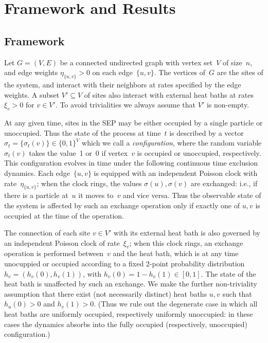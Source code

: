 \documentclass[11pt]{article}
\theoremstyle{plain}
\theoremstyle{definition}
\theoremstyle{remark}
\numberwithin{equation}{section}
\begin{document}

\section{Framework and Results} \label{sec:fmwkresults}
\subsection{Framework}\label{subs:fmwk}
Let $G=(V,E)$ be a connected undirected graph with vertex set~$V$ of size~$n$, and edge weights
$\eta_{\{u,v\}}>0$ on each edge~$\{u,v\}$.  The vertices of~$G$ are the sites of the system, and interact
with their neighbors at rates specified by the edge weights.  A subset $V'\subseteq V$ of sites also
interact with external heat baths at rates $\xi_v> 0$ for $v\in V'$.  To avoid trivialities we always assume that $V'$ is non-empty.

At any given time, sites in the SEP may be either occupied by a single particle or unoccupied.  Thus the
state of the process at time~$t$ is described by a vector $\sigma_t=\{\sigma_t(v)\}\in \{0,1\}^V$ which we
call a {\it configuration}, where the random
variable $\sigma_t(v)$ takes the value~1 or~0 if vertex~$v$ is occupied or unoccupied, respectively.  This configuration
evolves in time under the following continuous time exclusion dynamics.  Each edge~$\{u,v\}$ is equipped
with an independent Poisson clock with rate~$\eta_{\{u,v\}}$; when the clock rings, the values $\sigma(u),\sigma(v)$ are
exchanged: i.e., if there is a particle at~$u$ it moves to~$v$ and vice versa.  Thus the observable state of
the system is affected by such an exchange operation only if exactly one of $u,v$ is occupied at the time
of the operation.

The connection of each site $v\in V'$ with its external heat bath is also governed by an independent Poisson
clock of rate~$\xi_v$; when this clock rings, an exchange
operation is performed between~$v$ and the heat bath, which is at any time unocuppied or occupied
according to a fixed 2-point probability distribution $h_v=(h_v(0),h_v(1))$, with $h_v(0)=1-h_v(1)\in [0,1]$.
The state of the heat bath is unaffected by such an exchange.  We make the further non-triviality assumption
that there exist (not necessarily distinct) heat baths $u,v$ such that $h_u(0)>0$ and $h_v(1)>0$.  (Thus we
rule out the degenerate case in which all heat baths are uniformly occupied, respectively uniformly unoccupied:
in these cases the dynamics absorbs into the fully occupied (respectively, unoccupied) configuration.)
\end{document}
